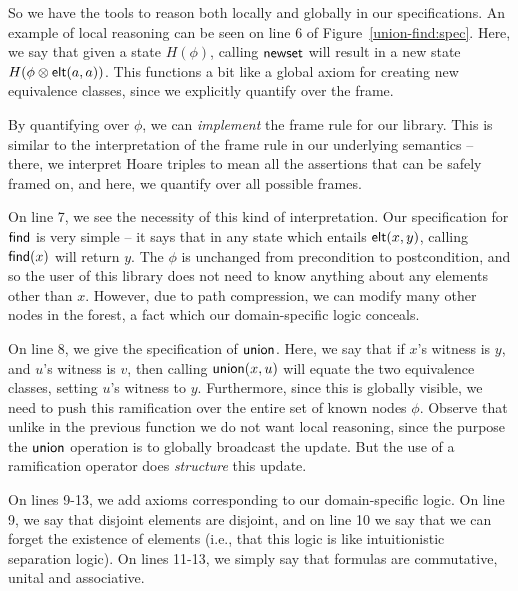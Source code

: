 So we have the tools to reason both locally and globally in our
specifications.  An example of local reasoning can be seen on line 6
of Figure~\ref{union-find:spec}.  Here, we say that given a state
$H(\phi)$, calling $\mathsf{newset}$ will result in a new state $H(\phi
\otimes \mathsf{elt}({a}, {a}))$. This functions a bit like a global axiom for
creating new equivalence classes, since we explicitly quantify over
the frame.

By quantifying over $\phi$, we can \emph{implement} the frame rule for
our library. This is similar to the interpretation of the frame rule
in our underlying semantics -- there, we interpret Hoare triples to mean all
the assertions that can be safely framed on, and here, we quantify over
all possible frames. 

On line 7, we see the necessity of this kind of interpretation. Our
specification for $\mathsf{find}$ is very simple -- it says that in any state
which entails $\mathsf{elt}({x}, {y})$, calling $\mathsf{find}(x)$ will return $y$. The
$\phi$ is unchanged from precondition to postcondition, and so the
user of this library does not need to know anything about any elements
other than $x$. However, due to path compression, we can modify 
many other nodes in the forest, a fact which our domain-specific
logic conceals. 

On line 8, we give the specification of $\mathsf{union}$. Here, we say that if
$x$'s witness is $y$, and $u$'s witness is $v$, then calling
$\mathsf{union}(x,u)$ will equate the two equivalence classes, setting $u$'s
witness to $y$. Furthermore, since this is globally visible, we need
to push this ramification over the entire set of known nodes
$\phi$. Observe that unlike in the previous function we do not want
local reasoning, since the purpose the $\mathsf{union}$ operation is to
globally broadcast the update. But the use of a ramification operator
does \emph{structure} this update.

On lines 9-13, we add axioms corresponding to our domain-specific
logic.  On line 9, we say that disjoint elements are disjoint, and on
line 10 we say that we can forget the existence of elements (i.e., that
this logic is like intuitionistic separation logic). On lines 11-13,
we simply say that formulas are commutative, unital and associative. 

